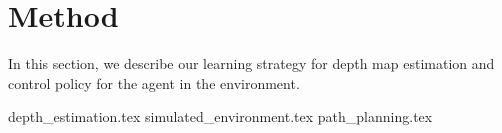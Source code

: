 \section{Method}
In this section, we describe our learning strategy for depth map estimation and control policy for the agent in the environment.

{depth_estimation.tex}
{simulated_environment.tex}
{path_planning.tex}